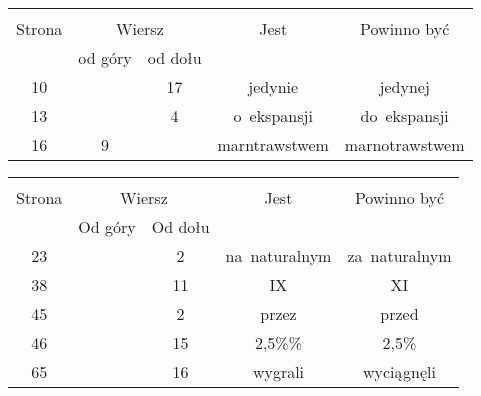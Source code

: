 \documentclass[a4paper,11pt]{article}
\begin{document}
\begin{center}
  \begin{tabular}{|c|c|c|c|c|}
    \hline
    & \multicolumn{2}{c|}{} & & \\
    Strona & \multicolumn{2}{c|}{Wiersz} & Jest
                              & Powinno być \\ \cline{2-3}
    & od góry & od dołu & & \\
    \hline
    10  & & 17 & jedynie & jedynej \\
    13  & &  4 & o~ekspansji & do~ekspansji \\
    16  &  9 & & marntrawstwem & marnotrawstwem \\
    \hline
  \end{tabular}
\end{center}

\vspace{\spaceTwo}








\begin{center}
  \begin{tabular}{|c|c|c|c|c|}
    \hline
    & \multicolumn{2}{c|}{} & & \\
    Strona & \multicolumn{2}{c|}{Wiersz} & Jest
                              & Powinno być \\ \cline{2-3}
    & Od góry & Od dołu & & \\
    \hline
    23 & &  2 & na~naturalnym & za~naturalnym \\
    38 & & 11 & IX & XI \\
    45 & &  2 & przez & przed \\
    46 & & 15 & 2,5\%\% & 2,5\% \\
    65 & & 16 & wygrali & wyciągnęli \\
    \hline
  \end{tabular}
\end{center}
\end{document}
